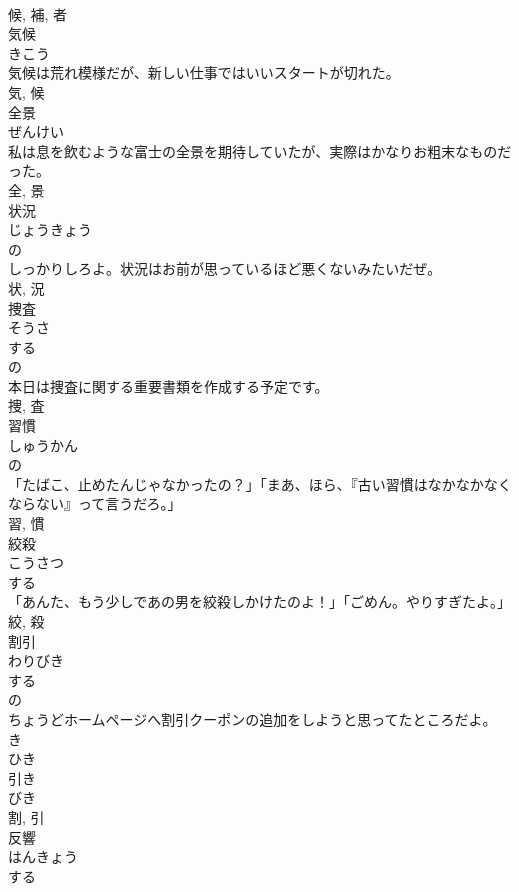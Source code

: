 \documentclass[8pt]{extreport}
\begin{document}
\begin{CJK}{UTF8}{min}
\\	候, 補, 者	
\\	気候	
\\	きこう	
\\	気候は荒れ模様だが、新しい仕事ではいいスタートが切れた。	
\\	気, 候	
\\	全景	
\\	ぜんけい	
\\	私は息を飲むような富士の全景を期待していたが、実際はかなりお粗末なものだった。	
\\	全, 景	
\\	状況	
\\	じょうきょう	
\\	の 
\\	しっかりしろよ。状況はお前が思っているほど悪くないみたいだぜ。	
\\	状, 況	
\\	捜査	
\\	そうさ	
\\	する 
\\	の 
\\	本日は捜査に関する重要書類を作成する予定です。	
\\	捜, 査	
\\	習慣	
\\	しゅうかん	
\\	の 
\\	「たばこ、止めたんじゃなかったの？」「まあ、ほら、『古い習慣はなかなかなくならない』って言うだろ。」	
\\	習, 慣	
\\	絞殺	
\\	こうさつ	
\\	する 
\\	「あんた、もう少しであの男を絞殺しかけたのよ！」「ごめん。やりすぎたよ。」	
\\	絞, 殺	
\\	割引	
\\	わりびき	
\\	する 
\\	の 
\\	ちょうどホームページへ割引クーポンの追加をしようと思ってたところだよ。	
\\	き 
\\	ひき 
\\	引き 
\\	びき 
\\	割, 引	
\\	反響	
\\	はんきょう	
\\	する 

\end{CJK}
\end{document}
